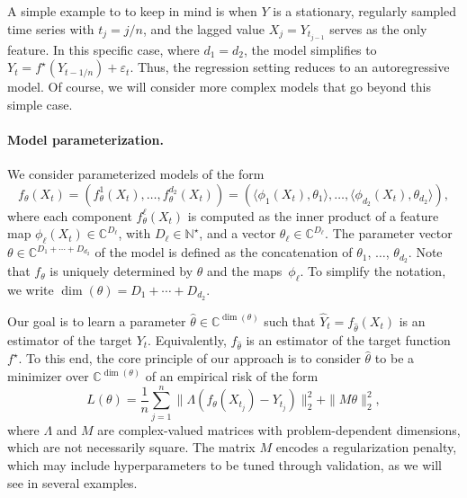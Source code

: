 A simple example to to keep in mind is when $Y$ is a stationary, regularly sampled time series with $t_j = j/n$, and the lagged value $X_j = Y_{t_{j-1}}$ serves as the only feature. In this specific case, where $d_1 = d_2$, the model simplifies to
$Y_t = f^\star(Y_{t-1/n})+\varepsilon_t$. Thus, the regression setting reduces to an autoregressive model. Of course, we will consider more complex models that go beyond this simple case.



\paragraph{Model parameterization.} We consider parameterized models of the form 
\begin{equation}
    f_{\theta}(X_t) = (f^1_{\theta}(X_t), \hdots, f^{d_2}_{\theta}(X_t)) =  (\langle \phi_1(X_t), \theta_1\rangle, \hdots, \langle \phi_{d_2}(X_t), \theta_{d_2}\rangle),
    \label{eq:model_def}
\end{equation} 
where each component  $f^\ell_\theta(X_t)$ is computed as the inner product of a feature map $\phi_\ell(X_t) \in \mathbb{C}^{D_\ell}$, with $D_\ell \in \mathbb N^\star$, and a vector $\theta_\ell \in \mathbb{C}^{D_\ell}$. 
The parameter vector $\theta \in \mathbb C^{D_1 + \cdots + D_{d_2}}$ of the model is defined as the concatenation of $\theta_1$, $\dots$, $\theta_{d_2}$. 
Note that $f_\theta$ is uniquely determined by $\theta$ and the maps~$\phi_\ell$.
To simplify the notation, we write $\dim(\theta) = D_1 + \cdots + D_{d_2}$. 

Our goal is to learn a parameter $\hat \theta \in \mathbb C^{\dim(\theta)}$ such that $\hat Y_t  = f_{\hat{\theta}}(X_t)$ is an estimator of the target $Y_t$.
Equivalently, $f_{\hat{\theta}}$ is an estimator of the target function $f^\star$. 
To this end, the core principle of our approach is to consider $\hat \theta$ to be a minimizer over $\mathbb C^{\dim(\theta)}$ of an empirical risk of the form
\begin{equation}
    L(\theta) = \frac{1}{n}\sum_{j=1}^n \|\Lambda(f_\theta(X_{t_j})-Y_{t_j})\|_2^2  + \|M\theta\|_2^2,
    \label{eq:risk}
\end{equation}
where $\Lambda$ and $M$ are complex-valued matrices with problem-dependent dimensions, which are not necessarily square. The matrix $M$ encodes a regularization penalty, which may include hyperparameters to be tuned through validation, as we will see in several examples.

